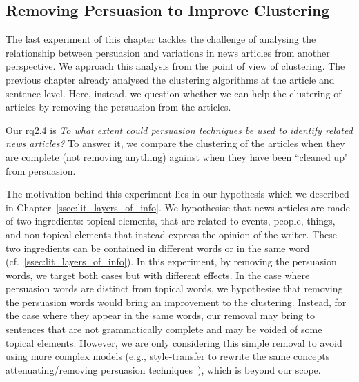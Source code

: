 \subsection{\statusgreen Removing Persuasion to Improve Clustering}
\label{ssec:lp_relationship_removing}

The last experiment of this chapter tackles the challenge of analysing the relationship between persuasion and variations in news articles from another perspective.
We approach this analysis from the point of view of clustering.
The previous chapter already analysed the clustering algorithms at the article and sentence level.
Here, instead, we question whether we can help the clustering of articles by removing the persuasion from the articles.

Our \acrshort{rq}2.4 is \emph{To what extent could persuasion techniques be used to identify related news articles?}
To answer it, we compare the clustering of the articles when they are complete (not removing anything) against when they have been ``cleaned up" from persuasion.

The motivation behind this experiment lies in our hypothesis which we described in Chapter~\ref{ssec:lit_layers_of_info}. We hypothesise that news articles are made of two ingredients: topical elements, that are related to events, people, things, and non-topical elements that instead express the opinion of the writer. These two ingredients can be contained in different words or in the same word (cf.~\ref{ssec:lit_layers_of_info}).
In this experiment, by removing the persuasion words, we target both cases but with different effects.
In the case where persuasion words are distinct from topical words, we hypothesise that removing the persuasion words would bring an improvement to the clustering.
Instead, for the case where they appear in the same words, our removal may bring to sentences that are not grammatically complete and may be voided of some topical elements.
However, we are only considering this simple removal to avoid using more complex models
(e.g., style-transfer to rewrite the same concepts attenuating/removing persuasion techniques~\citep{bagdasaryan2022spinning}), which is beyond our scope. %


